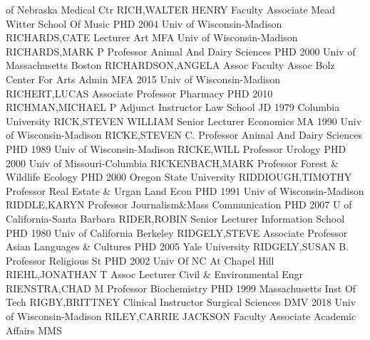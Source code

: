 \documentclass[
]{article}
\begin{document}
of Nebraska Medical Ctr \textbar RICH,WALTER HENRY \textbar{}
 \textbar Faculty Associate \textbar Mead Witter School Of
Music \textbar PHD 2004 Univ of Wisconsin-Madison \textbar RICHARDS,CATE
\textbar{}  \textbar Lecturer \textbar Art \textbar MFA Univ
of Wisconsin-Madison \textbar RICHARDS,MARK P \textbar{} 
\textbar Professor \textbar Animal And Dairy Sciences \textbar PHD 2000
Univ of Massachusetts Boston \textbar RICHARDSON,ANGELA \textbar{}
 \textbar Assoc Faculty Assoc \textbar Bolz Center For Arts
Admin \textbar MFA 2015 Univ of Wisconsin-Madison \textbar RICHERT,LUCAS
\textbar{}  \textbar Associate Professor \textbar Pharmacy
\textbar PHD 2010 \textbar RICHMAN,MICHAEL P \textbar{} 
\textbar Adjunct Instructor \textbar Law School \textbar JD 1979
Columbia University \textbar RICK,STEVEN WILLIAM \textbar{} 
\textbar Senior Lecturer \textbar Economics \textbar MA 1990 Univ of
Wisconsin-Madison \textbar RICKE,STEVEN C. \textbar{} 
\textbar Professor \textbar Animal And Dairy Sciences \textbar PHD 1989
Univ of Wisconsin-Madison \textbar RICKE,WILL \textbar{} 
\textbar Professor \textbar Urology \textbar PHD 2000 Univ of
Missouri-Columbia \textbar RICKENBACH,MARK \textbar{} 
\textbar Professor \textbar Forest \& Wildlife Ecology \textbar PHD 2000
Oregon State University \textbar RIDDIOUGH,TIMOTHY \textbar{}
 \textbar Professor \textbar Real Estate \& Urgan Land Econ
\textbar PHD 1991 Univ of Wisconsin-Madison \textbar RIDDLE,KARYN
\textbar{}  \textbar Professor \textbar Journalism\&Mass
Communication \textbar PHD 2007 U of California-Santa Barbara
\textbar RIDER,ROBIN \textbar{}  \textbar Senior Lecturer
\textbar Information School \textbar PHD 1980 Univ of California
Berkeley \textbar RIDGELY,STEVE \textbar{} 
\textbar Associate Professor \textbar Asian Languages \& Cultures
\textbar PHD 2005 Yale University \textbar RIDGELY,SUSAN B. \textbar{}
 \textbar Professor \textbar Religious St \textbar PHD 2002
Univ Of NC At Chapel Hill \textbar RIEHL,JONATHAN T \textbar{}
 \textbar Assoc Lecturer \textbar Civil \& Environmental
Engr \textbar RIENSTRA,CHAD M \textbar Professor \textbar{} 
\textbar Biochemistry \textbar PHD 1999 Massachusetts Inst Of Tech
\textbar RIGBY,BRITTNEY \textbar Clinical Instructor \textbar{}
 \textbar Surgical Sciences \textbar DMV 2018 Univ of
Wisconsin-Madison \textbar RILEY,CARRIE JACKSON \textbar Faculty
Associate \textbar{}  \textbar Academic Affairs \textbar MMS
\end{document}
